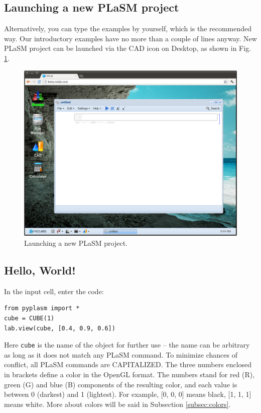 \documentclass{article}
\begin{document}
\subsection{Launching a new PLaSM project}

Alternatively, you can type the examples by yourself, which is the 
recommended way. Our introductory examples have no more than 
a couple of lines anyway. New PLaSM project can be launched via the CAD
icon on Desktop, as shown in Fig. \ref{fig:python}.
\newpage

\begin{figure}[!ht]
\begin{center}
\includegraphics[width=\textwidth]{img/python.png}
\end{center}
\caption{Launching a new PLaSM project.}
\label{fig:python}
\end{figure}
\noindent

\subsection{Hello, World!}

In the input cell, enter the code:

\begin{verbatim}
from pyplasm import *
cube = CUBE(1)
lab.view(cube, [0.4, 0.9, 0.6])
\end{verbatim}
Here {\tt cube} is the name of the object for further use -- the name can
be arbitrary as long as it does not match any PLaSM command. To minimize
chances of conflict, all PLaSM commands are CAPITALIZED.
The three numbers enclosed in brackets define a color in the 
OpenGL format. The numbers stand for red (R), green (G) and blue (B) 
components of the resulting color, and each value is between 0 (darkest) and 
1 (lightest). For example, [0, 0, 0] means black, [1, 1, 1] means white. 
More about colors will be said in Subsection \ref{subsec:colors}.
\end{document}
